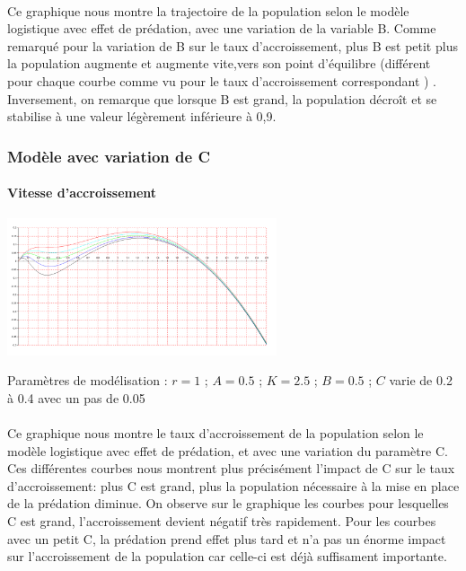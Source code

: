 \documentclass{article}
\begin{document}
\paragraph{}
Ce graphique nous montre la trajectoire de la population selon le modèle logistique avec effet de prédation, avec une variation de la variable B. Comme remarqué pour la variation de B sur le taux d'accroissement, plus B est petit plus la population augmente et augmente vite,vers son point d'équilibre (différent pour chaque courbe comme vu pour le taux d'accroissement correspondant ) . Inversement, on remarque que lorsque B est grand, la population décroît et se stabilise à une valeur légèrement inférieure à 0,9.

\subsubsection{Modèle avec variation de C}

\paragraph{Vitesse d'accroissement}
\begin{center}
\includegraphics[width=300px]{img/part2/logC.png}
\end{center}
Paramètres de modélisation :  $r=1$ ; $A=0.5$ ; $K=2.5$ ; $B=0.5$ ; $C$ varie de 0.2 à 0.4 avec un pas de 0.05
\paragraph{}
Ce graphique nous montre le taux d'accroissement de la population selon le modèle logistique avec effet de prédation, et avec une variation du paramètre C. Ces différentes courbes nous montrent plus précisément l'impact de C sur le taux d'accroissement: plus C est grand, plus la population nécessaire à la mise en place de la prédation diminue. On observe sur le graphique les courbes pour lesquelles C est grand, l'accroissement devient négatif très rapidement. Pour les courbes avec un petit C, la prédation prend effet plus tard et n'a pas un énorme impact sur l'accroissement de la population car celle-ci est déjà suffisament importante.
\end{document}
